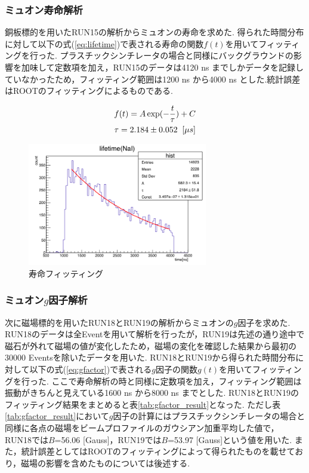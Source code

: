 
\subsubsection{ミュオン寿命解析}

銅板標的を用いたRUN15の解析からミュオンの寿命を求めた.
得られた時間分布に対して以下の式(\ref{eq:lifetime})で表される寿命の関数$f(t)$を用いてフィッティングを行った.
プラスチックシンチレータの場合と同様にバックグラウンドの影響を加味して定数項を加え，RUN15のデータは4120 ns までしかデータを記録していなかったため，フィッティング範囲は1200 ns から4000 ns とした.統計誤差はROOTのフィッティングによるものである.

\begin{gather}
  f(t) = A\exp(-\frac{t}{\tau})+C \label{eq:lifetime}\\
  \tau = 2.184 \pm 0.052 \;\;[\mu s] \notag
\end{gather}
\begin{figure}[H]
  \centering
    \includegraphics[width  = 0.7\textwidth]{figure/mino/lifetime_NaI_ratio.png}
    \caption{寿命フィッティング}
\end{figure}


\subsubsection{ミュオン$g$因子解析}

次に磁場標的を用いたRUN18とRUN19の解析からミュオンの$g$因子を求めた.
RUN18のデータは全Eventを用いて解析を行ったが，RUN19は先述の通り途中で磁石が外れて磁場の値が変化したため，磁場の変化を確認した結果から最初の30000 Eventsを除いたデータを用いた.
RUN18とRUN19から得られた時間分布に対して以下の式(\ref{eq:gfactor})で表される$g$因子の関数$g(t)$を用いてフィッティングを行った.
ここで寿命解析の時と同様に定数項を加え，フィッティング範囲は振動がきちんと見えている1600 ns から8000 ns までとした.
RUN18とRUN19のフィッティング結果をまとめると表\ref{tab:gfactor_result}となった.
ただし表\ref{tab:gfactor_result}において$g$因子の計算にはプラスチックシンチレータの場合と同様に各点の磁場をビームプロファイルのガウシアン加重平均した値で，RUN18では$B$=56.06 [Gauss]，RUN19では$B$=53.97 [Gauss]という値を用いた.
また，統計誤差としてはROOTのフィッティングによって得られたものを載せており，磁場の影響を含めたものについては後述する.


